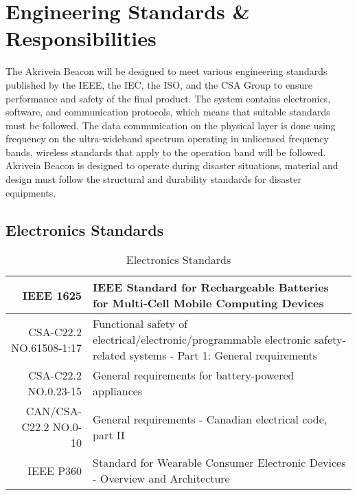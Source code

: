 

\setcounter{section}{3}
\section{Engineering Standards \& Responsibilities}
\bigskip
The Akriveia Beacon will be designed to meet various engineering standards published by the \Gls{IEEE}, the \Gls{IEC}, the \Gls{ISO}, and the \Gls{CSA} Group to ensure performance and safety of the final product. The system contains electronics, software, and communication protocols, which means that suitable standards must be followed. The data communication on the physical layer is done using frequency on the ultra-wideband spectrum operating in unlicensed frequency bands, wireless standards that apply to the operation band will be followed. Akriveia Beacon is designed to operate during disaster situations, material and design must follow the structural and durability standards for disaster equipments. 


\subsection{Electronics Standards}
\bgroup
\def\arraystretch{1.5}
\begin{table}[H]
\centering
\begin{tabular}{ |p{3cm} p{11cm} | }
\hline
\multicolumn{1}{|r|}{IEEE 1625} & IEEE Standard for Rechargeable Batteries for Multi-Cell Mobile Computing Devices \cite{R7}\\ 
\hline
\multicolumn{1}{|r|}{CSA-C22.2 NO.61508-1:17} & Functional safety of electrical/electronic/programmable electronic safety-related systems - Part 1: General requirements \cite{R8}\\ 
\hline
\multicolumn{1}{|r|}{CSA-C22.2 NO.0.23-15} & General requirements for battery-powered appliances \cite{R9}\\  
\hline
\multicolumn{1}{|r|}{CAN/CSA-C22.2 NO.0-10} & General requirements - Canadian electrical code, part II \cite{R10}\\ 
\hline
\multicolumn{1}{|r|}{IEEE P360} & Standard for Wearable Consumer Electronic Devices - Overview and Architecture \cite{R11} \\  
\hline
\end{tabular}
\caption{Electronics Standards}
\end{table}	
\medskip


